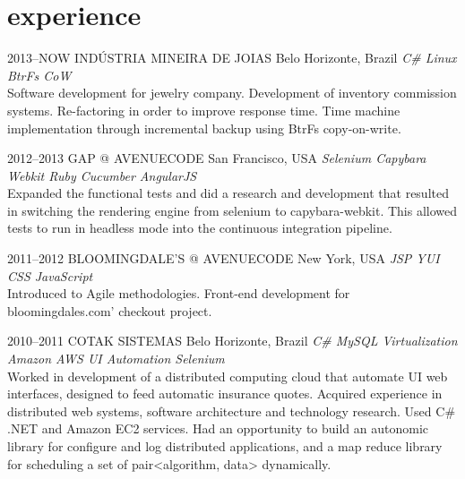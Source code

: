 \documentclass[]{friggeri-cv}
\begin{document}
\section{experience}

\begin{entrylist}


\entry
{2013--NOW}
{INDÚSTRIA MINEIRA DE JOIAS}
{Belo Horizonte, Brazil}
{\emph{\bullet C\# \bullet Linux \bullet BtrFs CoW  } \\ Software development for jewelry company. Development of inventory commission systems. Re-factoring in order to improve response time. Time machine implementation through incremental backup using BtrFs copy-on-write. }


\entry
{2012--2013}
{GAP @ AVENUECODE}
{San Francisco, USA}
{\emph{\bullet Selenium \bullet Capybara \bullet Webkit \bullet Ruby \bullet Cucumber \bullet AngularJS } \\ Expanded the functional tests and did a research and development that resulted in switching the rendering engine from selenium to capybara-webkit. This allowed tests to run in  headless mode into the continuous integration pipeline.
}


\entry
{2011--2012}
{BLOOMINGDALE'S @ AVENUECODE}
{New York, USA}
{\emph{\bullet JSP \bullet YUI \bullet CSS \bullet JavaScript } \\ Introduced to Agile methodologies. Front-end development for bloomingdales.com' checkout project. 
}

\entry
{2010--2011}
{COTAK SISTEMAS}
{Belo Horizonte, Brazil}
{\emph{\bullet C\# \bullet MySQL \bullet Virtualization \bullet Amazon AWS \bullet UI Automation \bullet Selenium } \\ Worked in development of a distributed computing cloud that automate UI web interfaces, designed to feed automatic insurance quotes. Acquired experience in distributed web systems, software architecture and technology research. Used C\# .NET and Amazon EC2 services. Had an opportunity to build an autonomic library for configure and log distributed applications, and a map reduce library for scheduling a set of pair<algorithm, data> dynamically.
}


\end{entrylist}
\end{document}
